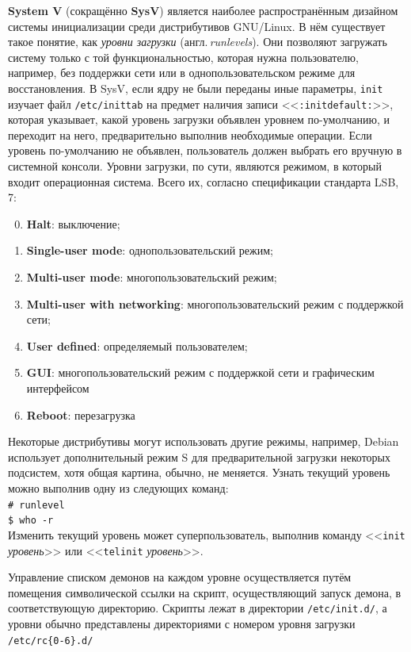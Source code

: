 \textbf{System V} (сокращённо \textbf{SysV}) является наиболее распространённым дизайном системы инициализации среди дистрибутивов GNU/Linux. В нём существует такое понятие, как \emph{уровни загрузки} (англ.\,\emph{run\-le\-vels}). Они позволяют загружать систему только с той функциональностью, которая нужна пользователю, например, без поддержки сети или в однопользовательском режиме для восстановления.
В SysV, если ядру не были переданы иные параметры, \texttt{init} изучает файл \texttt{/etc/inittab} на предмет наличия записи <<\texttt{:initdefault:}>>, которая указывает, какой уровень загрузки объявлен уровнем по-умол\-ча\-нию, и переходит на него, предварительно выполнив необходимые операции. Если уровень по-умолчанию не объявлен, пользователь должен выбрать его вручную в системной консоли.
Уровни загрузки, по сути, являются режимом, в который входит операционная система. Всего их, согласно спецификации стандарта LSB, 7:
 \begin{enumerate}
  \setcounter{enumi}{-1}
  \item \textbf{Halt}: выключение;
  \item \textbf{Single-user mode}: однопользовательский режим;
  \item \textbf{Multi-user mode}: многопользовательский режим;
  \item \textbf{Multi-user with networking}: многопользовательский режим с поддержкой сети;
  \item \textbf{User defined}: определяемый пользователем;
  \item \textbf{GUI}: многопользовательский режим с поддержкой сети и графическим интерфейсом
  \item \textbf{Reboot}: перезагрузка
 \end{enumerate}
Некоторые дистрибутивы могут использовать другие режимы, например, Debian использует дополнительный режим S для предварительной загрузки некоторых подсистем, хотя общая картина, обычно, не меняется. Узнать текущий уровень можно выполнив одну из следующих команд:\\
\texttt{\# runlevel}\\
\texttt{\$ who -r}\\
Изменить текущий уровень может суперпользователь, выполнив команду <<\texttt{init} \emph{уровень}>> или <<\texttt{telinit} \emph{уровень}>>.
 
Управление списком демонов на каждом уровне осуществляется путём помещения символической ссылки на скрипт, осуществляющий запуск демона, в соответствующую директорию. Скрипты лежат в директории \texttt{/etc/init.d/}, а уровни обычно представлены директориями с номером уровня загрузки \texttt{/etc/rc\{0-6\}.d/}
 

